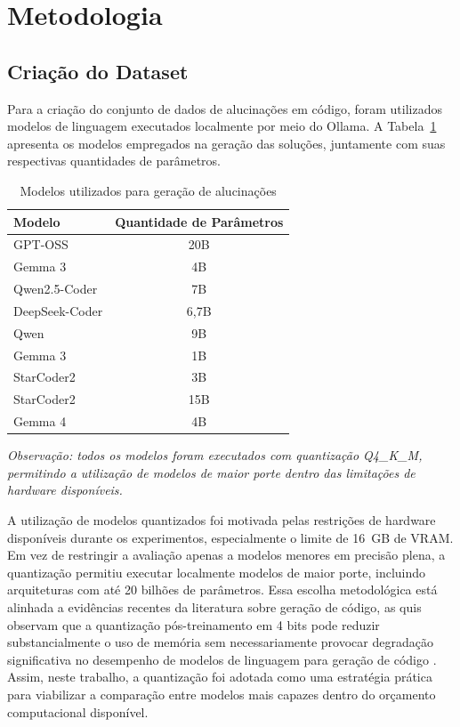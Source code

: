 \documentclass[conference]{IEEEtran}
\begin{document}
\section{Metodologia}

\subsection{Criação do Dataset}

Para a criação do conjunto de dados de alucinações em código, foram utilizados modelos de linguagem executados localmente por meio do Ollama. A Tabela~\ref{tab:modelos-dataset} apresenta os modelos empregados na geração das soluções, juntamente com suas respectivas quantidades de parâmetros.

\begin{table}[!htbp]
\centering
\caption{Modelos utilizados para geração de alucinações}
\label{tab:modelos-dataset}

\begin{tabular}{lc}
\toprule
\textbf{Modelo} & \textbf{Quantidade de Parâmetros} \\
\midrule
GPT-OSS & 20B \\
Gemma 3 & 4B \\
Qwen2.5-Coder & 7B \\
DeepSeek-Coder & 6{,}7B \\
Qwen & 9B \\
Gemma 3 & 1B \\
StarCoder2 & 3B \\
StarCoder2 & 15B \\
Gemma 4 & 4B \\
\bottomrule
\end{tabular}

\vspace{0.2cm}
\begin{minipage}{0.85\linewidth}
\footnotesize
\textit{Observação: todos os modelos foram executados com quantização \emph{Q4\_K\_M}, permitindo a utilização de modelos de maior porte dentro das limitações de hardware disponíveis.}
\end{minipage}

\end{table}

A utilização de modelos quantizados foi motivada pelas restrições de hardware disponíveis durante os experimentos, especialmente o limite de 16~GB de VRAM. Em vez de restringir a avaliação apenas a modelos menores em precisão plena, a quantização permitiu executar localmente modelos de maior porte, incluindo arquiteturas com até 20 bilhões de parâmetros. Essa escolha metodológica está alinhada a evidências recentes da literatura sobre geração de código, as quis observam que a quantização pós-treinamento em 4 bits pode reduzir substancialmente o uso de memória sem necessariamente provocar degradação significativa no desempenho de modelos de linguagem para geração de código \cite{2503.07103}. Assim, neste trabalho, a quantização foi adotada como uma estratégia prática para viabilizar a comparação entre modelos mais capazes dentro do orçamento computacional disponível.
\end{document}
